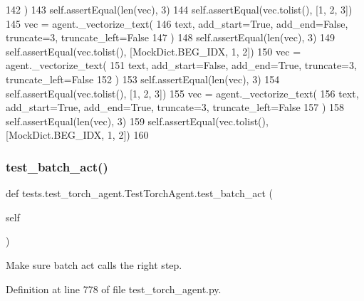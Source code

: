 \begin{DoxyCode}
142         )
143         self.assertEqual(len(vec), 3)
144         self.assertEqual(vec.tolist(), [1, 2, 3])
145         vec = agent.\_vectorize\_text(
146             text, add\_start=\textcolor{keyword}{True}, add\_end=\textcolor{keyword}{False}, truncate=3, truncate\_left=\textcolor{keyword}{False}
147         )
148         self.assertEqual(len(vec), 3)
149         self.assertEqual(vec.tolist(), [MockDict.BEG\_IDX, 1, 2])
150         vec = agent.\_vectorize\_text(
151             text, add\_start=\textcolor{keyword}{False}, add\_end=\textcolor{keyword}{True}, truncate=3, truncate\_left=\textcolor{keyword}{False}
152         )
153         self.assertEqual(len(vec), 3)
154         self.assertEqual(vec.tolist(), [1, 2, 3])
155         vec = agent.\_vectorize\_text(
156             text, add\_start=\textcolor{keyword}{True}, add\_end=\textcolor{keyword}{True}, truncate=3, truncate\_left=\textcolor{keyword}{False}
157         )
158         self.assertEqual(len(vec), 3)
159         self.assertEqual(vec.tolist(), [MockDict.BEG\_IDX, 1, 2])
160 
\end{DoxyCode}
\mbox{\label{classtests_1_1test__torch__agent_1_1TestTorchAgent_aed82743e884c933453d912cfa8c7ec7f}} 
\subsubsection{\texorpdfstring{test\+\_\+batch\+\_\+act()}{test\_batch\_act()}}
{\footnotesize\ttfamily def tests.\+test\+\_\+torch\+\_\+agent.\+Test\+Torch\+Agent.\+test\+\_\+batch\+\_\+act (\begin{DoxyParamCaption}\item[{}]{self }\end{DoxyParamCaption})}

\begin{DoxyVerb}Make sure batch act calls the right step.
\end{DoxyVerb}
 

Definition at line 778 of file test\+\_\+torch\+\_\+agent.\+py.


